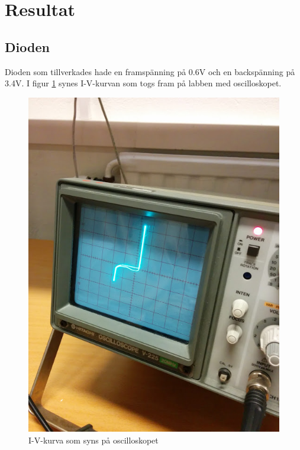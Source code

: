 \documentclass[a4paper]{article}
\begin{document}
\newpage
\section{Resultat}
\subsection{Dioden}
Dioden som tillverkades hade en framspänning på 0.6V och en backspänning på 3.4V. I figur \ref{diodiv} synes I-V-kurvan som togs fram på labben med oscilloskopet.
\begin{figure}[H]
	\centering
	\includegraphics[scale=.4]{diod.jpg}
	\caption{I-V-kurva som syns på oscilloskopet}
	\label{diodiv}
\end{figure}
\end{document}
